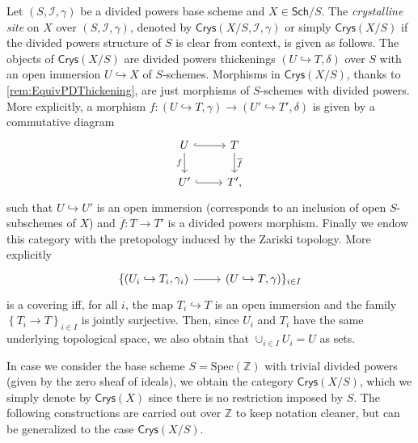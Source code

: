 \begin{defn}
	Let $\left(S, \mathcal{I}, \gamma\right)$ be a divided powers base scheme
	and $X \in \mathsf{Sch}/S$.
	The {\em crystalline site} on $X$ over $\left(S, \mathcal{I}, \gamma\right)$,
	denoted by $\mathsf{Crys}(X/S, \mathcal{I}, \gamma)$ or simply
	$\mathsf{Crys}(X/S)$ if the divided powers structure of $S$ 
	is clear from context, is given as follows.
	The objects of $\mathsf{Crys}(X/S)$ are
	divided powers thickenings $\left(U \hookrightarrow T, \delta\right)$ over $S$
	with an open immersion $U \hookrightarrow X$ of $S$-schemes.
	Morphisms in $\mathsf{Crys}(X/S)$, thanks to \cref{rem:EquivPDThickening},
	are just morphisms of $S$-schemes with divided powers.
	More explicitly, a morphism $f\colon \left(U \hookrightarrow T, \gamma\right)
	\to \left(U' \hookrightarrow T', \delta\right)$ is given by a commutative
	diagram
	\begin{equation}\label{diag:MorphDivPowers}
	\begin{tikzcd}
		U \arrow[d, "f"', rightarrow] \arrow[r, "", hookrightarrow] &
		T \arrow[d, "\overline{f}", rightarrow] \\
		U' \arrow[r, "", hookrightarrow] &
		T'
	,\end{tikzcd}
	\end{equation}
	such that $U \hookrightarrow U'$ is an open immersion (corresponds to
	an inclusion of open $S$-subschemes of $X$) and
	$\overline{f}\colon T \to T'$ is a divided powers morphism.
	Finally we endow this category with the pretopology induced by the
	Zariski topology.
	More explicitly 
	\begin{equation*}
	\begin{tikzcd}
		\{ \left(U_i \hookrightarrow T_i, \gamma_i\right)
		\arrow[r, "", rightarrow] &
		\left(U \hookrightarrow T, \gamma\right) \}_{i \in I}
	\end{tikzcd}
	\end{equation*}
	is a covering iff, for all $i$, the map
	$T_i \hookrightarrow T$ is an open immersion and
	the family $\left\{ T_i \to T \right\}_{i \in I}$
	is jointly surjective.
	Then, since $U_i$ and $T_i$ have the same underlying topological space,
	we also obtain that $\cup_{i \in I} U_i = U$ as sets.
\end{defn}


\begin{ntt}[]
	In case we consider the base scheme $S = \mathrm{Spec}(\mathbb{Z})$
	with trivial divided powers (given by the zero sheaf of ideals),
	we obtain the category $\mathsf{Crys}(X/S)$, which
	we simply denote by $\mathsf{Crys}(X)$ since there is no
	restriction imposed by $S$.
	The following constructions are carried out over $\mathbb{Z}$ to
	keep notation cleaner, but can be generalized to the case $\mathsf{Crys}(X/S)$.
\end{ntt}


